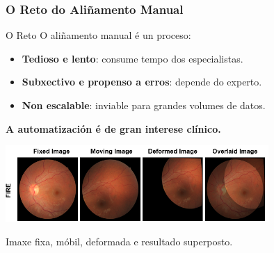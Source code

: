 \documentclass[xcolor=dvipsnames]{beamer}
\begin{document}
\begin{frame}
    \frametitle{O Reto do Aliñamento Manual}

    \begin{alertblock}{O Reto}
        O aliñamento manual é un proceso:
        \begin{itemize}
            \item \textbf{Tedioso e lento}: consume tempo dos especialistas.
            \item \textbf{Subxectivo e propenso a erros}: depende do experto.
            \item \textbf{Non escalable}: inviable para grandes volumes de datos.
        \end{itemize}
        \vspace{0.2cm}
        \rightarrow \textbf{A automatización é de gran interese clínico.}
    \end{alertblock}

    \begin{center}
        \includegraphics[width=0.75\textwidth]{../imaxes/retin-reg.png}
        
        \small Imaxe fixa, móbil, deformada e resultado superposto.
    \end{center}

\end{frame}
\end{document}
